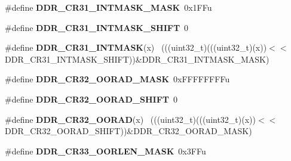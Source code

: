 \begin{DoxyCompactItemize}
\item 
\hypertarget{group___d_d_r___register___masks_ga577e3ab41429e23baaed8fe3ed1e485b}{}\#define {\bfseries D\+D\+R\+\_\+\+C\+R31\+\_\+\+I\+N\+T\+M\+A\+S\+K\+\_\+\+M\+A\+S\+K}~0x1\+F\+Fu\label{group___d_d_r___register___masks_ga577e3ab41429e23baaed8fe3ed1e485b}

\item 
\hypertarget{group___d_d_r___register___masks_ga5b7a32614a9186188c3362cc535708c3}{}\#define {\bfseries D\+D\+R\+\_\+\+C\+R31\+\_\+\+I\+N\+T\+M\+A\+S\+K\+\_\+\+S\+H\+I\+F\+T}~0\label{group___d_d_r___register___masks_ga5b7a32614a9186188c3362cc535708c3}

\item 
\hypertarget{group___d_d_r___register___masks_ga7df7b85b85a521892ce200fd02bc84b8}{}\#define {\bfseries D\+D\+R\+\_\+\+C\+R31\+\_\+\+I\+N\+T\+M\+A\+S\+K}(x)                                        ~(((uint32\+\_\+t)(((uint32\+\_\+t)(x))$<$$<$D\+D\+R\+\_\+\+C\+R31\+\_\+\+I\+N\+T\+M\+A\+S\+K\+\_\+\+S\+H\+I\+F\+T))\&D\+D\+R\+\_\+\+C\+R31\+\_\+\+I\+N\+T\+M\+A\+S\+K\+\_\+\+M\+A\+S\+K)\label{group___d_d_r___register___masks_ga7df7b85b85a521892ce200fd02bc84b8}

\item 
\hypertarget{group___d_d_r___register___masks_gab2308d41e01224cca565a1f4171bc93b}{}\#define {\bfseries D\+D\+R\+\_\+\+C\+R32\+\_\+\+O\+O\+R\+A\+D\+\_\+\+M\+A\+S\+K}~0x\+F\+F\+F\+F\+F\+F\+F\+Fu\label{group___d_d_r___register___masks_gab2308d41e01224cca565a1f4171bc93b}

\item 
\hypertarget{group___d_d_r___register___masks_gabe58a8468c9ffc5b5351d22ae52831e4}{}\#define {\bfseries D\+D\+R\+\_\+\+C\+R32\+\_\+\+O\+O\+R\+A\+D\+\_\+\+S\+H\+I\+F\+T}~0\label{group___d_d_r___register___masks_gabe58a8468c9ffc5b5351d22ae52831e4}

\item 
\hypertarget{group___d_d_r___register___masks_ga90fbb1c7eb28b83fa62173e4595b2a77}{}\#define {\bfseries D\+D\+R\+\_\+\+C\+R32\+\_\+\+O\+O\+R\+A\+D}(x)                                            ~(((uint32\+\_\+t)(((uint32\+\_\+t)(x))$<$$<$D\+D\+R\+\_\+\+C\+R32\+\_\+\+O\+O\+R\+A\+D\+\_\+\+S\+H\+I\+F\+T))\&D\+D\+R\+\_\+\+C\+R32\+\_\+\+O\+O\+R\+A\+D\+\_\+\+M\+A\+S\+K)\label{group___d_d_r___register___masks_ga90fbb1c7eb28b83fa62173e4595b2a77}

\item 
\hypertarget{group___d_d_r___register___masks_gafa924977d6ba8342ac85a94f4b9572fd}{}\#define {\bfseries D\+D\+R\+\_\+\+C\+R33\+\_\+\+O\+O\+R\+L\+E\+N\+\_\+\+M\+A\+S\+K}~0x3\+F\+Fu\label{group___d_d_r___register___masks_gafa924977d6ba8342ac85a94f4b9572fd}


\end{DoxyCompactItemize}

